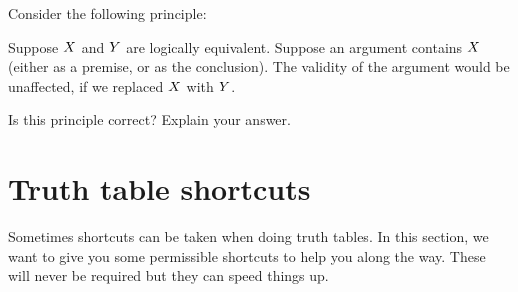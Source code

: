 \begin{practiceproblems}
	\problempart
	Consider the following principle:
	\begin{ebullet}
		\item Suppose $X$ and $Y$ are logically equivalent. Suppose an argument contains $X$ (either as a premise, or as the conclusion). The validity of the argument would be unaffected, if we replaced $X$ with $Y$.
	\end{ebullet}
	Is this principle correct? Explain your answer.
	
\end{practiceproblems}

\chapter{Truth table shortcuts}

Sometimes shortcuts can be taken when doing truth tables.
In this section, we want to give you some permissible shortcuts to help you along the way.
These will never be {required} but they can speed things up.




